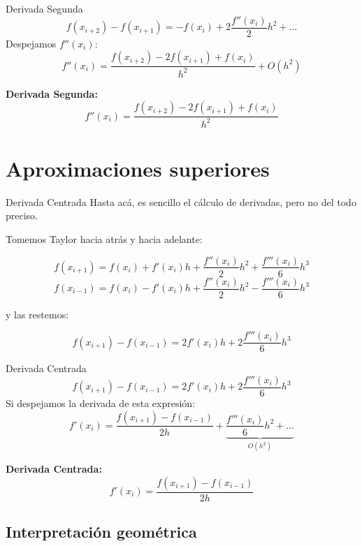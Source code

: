 \documentclass[xcolor=svgnames]{beamer} %
\theoremstyle{plain}
\renewcommand{\textbf}[1]{{\bfseries\textcolor{redUnq2}{#1}}}
\theoremstyle{definition}
\begin{document}
\begin{frame}{Derivada Segunda}  
  $$f(x_{i+2})-f(x_{i+1}) = -f(x_i) +2 \frac{f''(x_i)}{2} h^2 +\dots$$
	Despejamos $f''(x_i)$:\pause
	$$ f''(x_i) = \frac{f(x_{i+2}) -2f(x_{i+1})+f(x_{i})}{h^2} + O(h^2) $$
	\pause
	\begin{tcolorbox}  
	  \textbf{Derivada Segunda:}
	  $$ f''(x_i) = \frac{f(x_{i+2}) -2f(x_{i+1})+f(x_{i})}{h^2}$$
	\end{tcolorbox}
\end{frame}





\section{Aproximaciones superiores}


\begin{frame}{Derivada Centrada}
  Hasta acá, es sencillo el cálculo de derivadas, pero no del todo preciso.
  \pause
  
  Tomemos Taylor hacia atrás y hacia adelante:
  
  $$ f(x_{i+1})  = f(x_i) + f'(x_i) h +\frac{f''(x_i)}{2} {h^2}+\frac{f'''(x_i)}{6} {h^3}$$
  $$ f(x_{i-1}) = f(x_i) - f'(x_i) h +\frac{f''(x_i)}{2} {h^2}-\frac{f'''(x_i)}{6} {h^3}$$\pause

y las restemos: 

$$ f(x_{i+1}) -f(x_{i-1}) =2 f'(x_i) h + 2 \frac{f'''(x_i)}{6} h^3$$

\end{frame}

\begin{frame}{Derivada Centrada}
  $$ f(x_{i+1}) -f(x_{i-1}) =2 f'(x_i) h + 2 \frac{f'''(x_i)}{6} h^3$$
  Si despejamos la derivada de esta expresión:
  $$ f'(x_i) = \frac{f(x_{i+1})-f(x_{i-1})}{2 h} + \underbrace{\frac{f'''(x_i)}{6} h^2 +\dots}_{O(h^2)}$$\pause
  \begin{tcolorbox}
    \textbf{Derivada Centrada:}
    $$ f'(x_i) = \frac{f(x_{i+1})-f(x_{i-1})}{2 h} $$
  \end{tcolorbox}
  
\end{frame}

\subsection{Interpretación geométrica}
\end{document}
